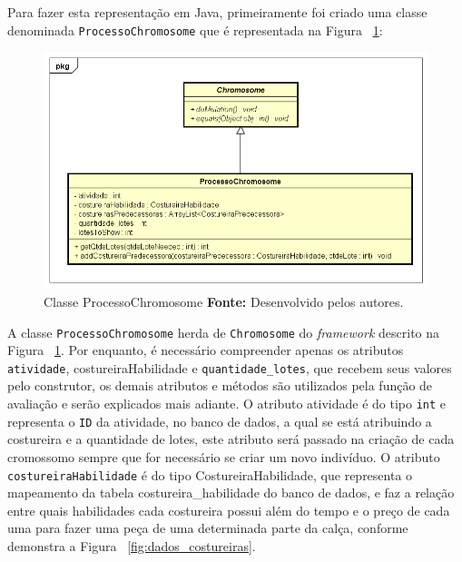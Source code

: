\par Para fazer esta representação em Java, primeiramente foi criado uma classe denominada \texttt{ProcessoChromosome} que é
representada na Figura ~\ref{fig:class_processoChromosome}:

\newpage

\begin{figure}[h!]
	\centerline{\includegraphics[scale=0.5]{./imagens/processo_chromosome_diagram.png}}
	\caption[Classe ProcessoChromosome]
	{Classe ProcessoChromosome \textbf{Fonte:} Desenvolvido pelos autores.}
	\label{fig:class_processoChromosome}
\end{figure}


\par A classe \texttt{ProcessoChromosome} herda de \texttt{Chromosome} do
\textit{framework} descrito na Figura ~\ref{fig:class_processoChromosome}. Por
enquanto, é necessário compreender apenas os atributos \texttt{atividade}, costureiraHabilidade e
\texttt{quantidade\_lotes}, que recebem seus valores pelo construtor, os
demais atributos e métodos são utilizados pela função de avaliação e serão explicados mais adiante. 
O atributo atividade é do tipo \texttt{int} e representa o \texttt{ID} da
atividade, no banco de dados, a qual se está atribuindo a costureira e a
quantidade de lotes, este atributo será passado na criação de cada cromossomo
sempre que for necessário se criar um novo indivíduo. O atributo \texttt{costureiraHabilidade} 
é do tipo CostureiraHabilidade, que representa o mapeamento da tabela costureira\_habilidade do banco de dados, 
e faz a relação entre quais habilidades cada costureira possui além do tempo e o preço de cada uma para 
fazer uma peça de uma determinada parte da calça, conforme demonstra a Figura ~\ref{fig:dados_costureiras}.


